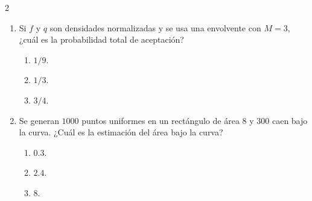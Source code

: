 \documentclass[11pt]{article}
\begin{document}
\begin{multicols}{2}
\begin{enumerate}
\begin{samepage}
\end{samepage}

    \item
    \begin{samepage}
    Si $f$ y $q$ son densidades normalizadas y se usa una envolvente con
    $M=3$, ¿cuál es la probabilidad total de aceptación?
    \begin{enumerate}
        \item $1/9$.
        \item $1/3$.
        \item $3/4$.
    \end{enumerate}

\end{samepage}

    \item
    \begin{samepage}
    Se generan $1000$ puntos uniformes en un rectángulo de área $8$ y
    $300$ caen bajo la curva. ¿Cuál es la estimación del área bajo la curva?
    \begin{enumerate}
        \item $0.3$.
        \item $2.4$.
        \item $8$.
    \end{enumerate}
\end{samepage}
\end{enumerate}
\end{multicols}
\endgroup
\end{document}

